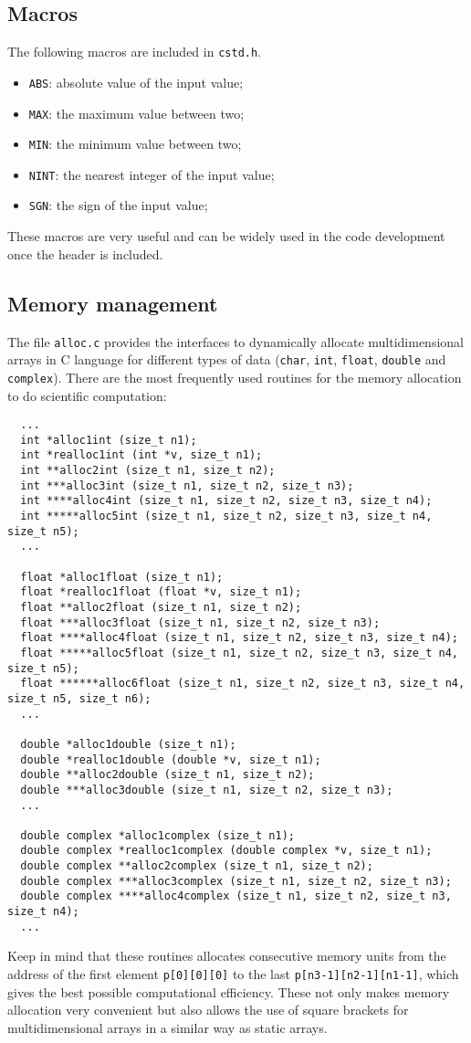 \documentclass[10pt]{article}
\begin{document}
\subsection{Macros}
The following macros are included in \verb|cstd.h|.
\begin{itemize}
\item \verb|ABS|: absolute value of the input value;
\item \verb|MAX|: the maximum value between two;
\item \verb|MIN|: the minimum value between two;
\item \verb|NINT|: the nearest integer of the input value;
\item \verb|SGN|: the sign of the input value;
\end{itemize}
These macros are very useful and can be widely used in the code development once the header is included.

\subsection{Memory management}
The file \verb|alloc.c| provides the interfaces to dynamically allocate multidimensional arrays in C language for different types of data (\verb|char|, \verb|int|, \verb|float|, \verb|double| and \verb|complex|). There are the most frequently used routines for the memory allocation to do scientific computation:
\begin{verbatim}
  ...
  int *alloc1int (size_t n1);
  int *realloc1int (int *v, size_t n1);
  int **alloc2int (size_t n1, size_t n2);
  int ***alloc3int (size_t n1, size_t n2, size_t n3);
  int ****alloc4int (size_t n1, size_t n2, size_t n3, size_t n4);
  int *****alloc5int (size_t n1, size_t n2, size_t n3, size_t n4, size_t n5);
  ...

  float *alloc1float (size_t n1);
  float *realloc1float (float *v, size_t n1);
  float **alloc2float (size_t n1, size_t n2);
  float ***alloc3float (size_t n1, size_t n2, size_t n3);
  float ****alloc4float (size_t n1, size_t n2, size_t n3, size_t n4);
  float *****alloc5float (size_t n1, size_t n2, size_t n3, size_t n4, size_t n5);
  float ******alloc6float (size_t n1, size_t n2, size_t n3, size_t n4, size_t n5, size_t n6);
  ...

  double *alloc1double (size_t n1);
  double *realloc1double (double *v, size_t n1);
  double **alloc2double (size_t n1, size_t n2);
  double ***alloc3double (size_t n1, size_t n2, size_t n3);
  ...

  double complex *alloc1complex (size_t n1);
  double complex *realloc1complex (double complex *v, size_t n1);
  double complex **alloc2complex (size_t n1, size_t n2);
  double complex ***alloc3complex (size_t n1, size_t n2, size_t n3);
  double complex ****alloc4complex (size_t n1, size_t n2, size_t n3, size_t n4);
  ...
\end{verbatim}
Keep in mind that these routines allocates consecutive memory units from the address of the first element \verb|p[0][0][0]| to the last \verb|p[n3-1][n2-1][n1-1]|, which gives the best possible computational efficiency. These not only makes memory allocation very convenient but also allows the use of square brackets for multidimensional arrays in a similar way as static arrays. 
\end{document}
